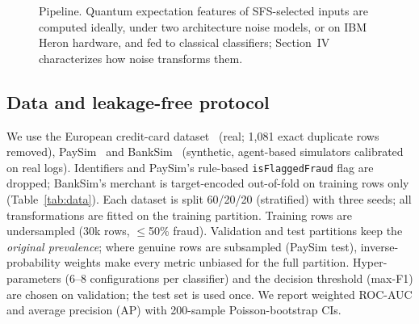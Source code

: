 \documentclass[conference,compsoc]{IEEEtran}
\begin{document}
\begin{figure}[t]
\centering
{}
\caption{Pipeline. Quantum expectation features of SFS-selected inputs are computed ideally, under two architecture noise models, or on IBM Heron hardware, and fed to classical classifiers; Section~IV characterizes how noise transforms them.}
\label{fig:pipeline}
\end{figure}

\subsection{Data and leakage-free protocol}
We use the European credit-card dataset~\cite{dalpozzolo2015} (real; 1,081 exact duplicate rows removed), PaySim~\cite{paysim2016} and BankSim~\cite{banksim2014} (synthetic, agent-based simulators calibrated on real logs). Identifiers and PaySim's rule-based \texttt{isFlaggedFraud} flag are dropped; BankSim's merchant is target-encoded out-of-fold on training rows only (Table~\ref{tab:data}). Each dataset is split 60/20/20 (stratified) with three seeds; all transformations are fitted on the training partition. Training rows are undersampled (30k rows, $\leq$50\% fraud). Validation and test partitions keep the \emph{original prevalence}; where genuine rows are subsampled (PaySim test), inverse-probability weights make every metric unbiased for the full partition. Hyper-parameters (6--8 configurations per classifier) and the decision threshold (max-F1) are chosen on validation; the test set is used once. We report weighted ROC-AUC and average precision (AP) with 200-sample Poisson-bootstrap CIs.
\end{document}
